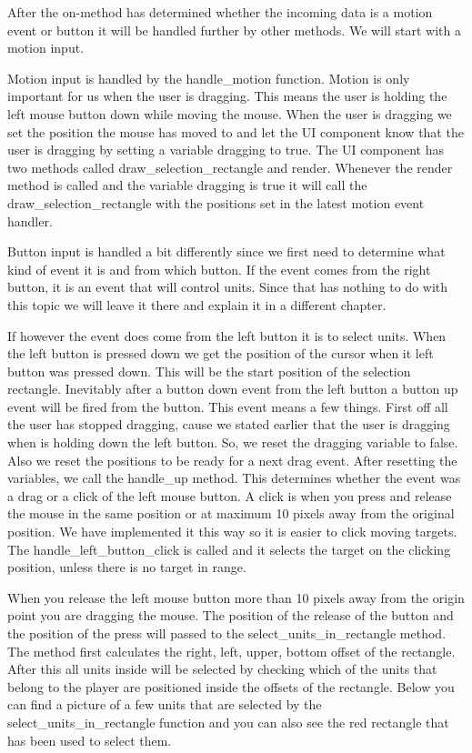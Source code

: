After the on-method has determined whether the incoming data is a motion event or button it will be handled further by other methods. We will start with a motion input.

Motion input is handled by the handle\_motion function. Motion is only important for us when the user is dragging. This means the user is holding the left mouse button down while moving the mouse. When the user is dragging we set the position the mouse has moved to and let the UI component know that the user is dragging by setting a variable dragging to true. The UI component has two methods called draw\_selection\_rectangle and render. Whenever the render method is called and the variable dragging is true it will call the draw\_selection\_rectangle with the positions set in the latest motion event handler.

Button input is handled a bit differently since we first need to determine what kind of event it is and from which button. If the event comes from the right button, it is an event that will control units. Since that has nothing to do with this topic we will leave it there and explain it in a different chapter. 

If however the event does come from the left button it is to select units. When the left button is pressed down we get the position of the cursor when it left button was pressed down. This will be the start position of the selection rectangle. Inevitably after a button down event from the left button a button up event will be fired from the button. This event means a few things. First off all the user has stopped dragging, cause we stated earlier that the user is dragging when is holding down the left button. So, we reset the dragging variable to false. Also we reset the positions to be ready for a next drag event. After resetting the variables, we call the handle\_up method. This determines whether the event was a drag or a click of the left mouse button. A click is when you press and release the mouse in the same position or at maximum 10 pixels away from the original position. We have implemented it this way so it is easier to click moving targets. The handle\_left\_button\_click is called and it selects the target on the clicking position, unless there is no target in range.

When you release the left mouse button more than 10 pixels away from the origin point you are dragging the mouse. The position of the release of the button and the position of the press will passed to the select\_units\_in\_rectangle method. The method first calculates the right, left, upper, bottom offset of the rectangle. After this all units inside will be selected by checking which of the units that belong to the player are positioned inside the offsets of the rectangle. Below you can find a picture of a few units that are selected by the select\_units\_in\_rectangle function and you can also see the red rectangle that has been used to select them. 

